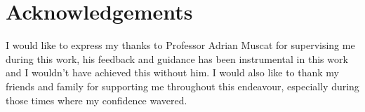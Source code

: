 \chapter*{Acknowledgements}

I would like to express my thanks to Professor Adrian Muscat for supervising me during this work, his feedback and guidance has been instrumental in this work and I wouldn't have achieved this without him.
I would also like to thank my friends and family for supporting me throughout this endeavour, especially during those times where my confidence wavered.
